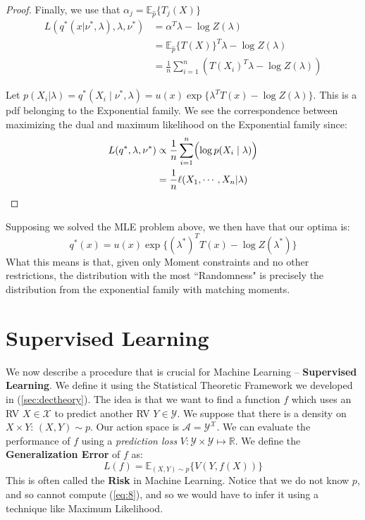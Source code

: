 \documentclass[]{article}
\theoremstyle{mattstyle}
\theoremstyle{definition}
\begin{document}
\begin{proof}
	Finally, we use that $\alpha_j = \mathbb{E}_{\hat{p}}\{T_j(X)\}$
	\begin{align*}
	L(q^*(x| \nu^*, \lambda),\lambda,\nu^*) &= \alpha^T\lambda -\log Z(\lambda)\\
	&= \mathbb{E}_{\hat{p}}\{T(X)\}^T\lambda - \log Z(\lambda)\\
	&= \frac{1}{n}\sum_{i=1}^n \left( T(X_i)^T\lambda - \log Z(\lambda) \right)
	\end{align*}
	
	Let  $p(X_i | \lambda) = q^*(X_i \mid \nu^*, \lambda) = u(x)\exp\{ \lambda^TT(x) - \log Z(\lambda)\}$. This is a pdf belonging to the Exponential family. We see the correspondence between maximizing the dual and maximum likelihood on the Exponential family since:
	\begin{align*}
	L(q^*,\lambda,\nu^*) &\propto \frac{1}{n}\sum_{i=1}^n \Bigl( \log p(X_i \mid \lambda) \Bigr) \\
	&=\frac{1}{n}\ell(X_1, \cdots, X_n | \lambda)
	\end{align*}
\end{proof}

Supposing we solved the MLE problem above, we then have that our optima is:
$$q^*(x)=u(x)\exp\{ (\lambda^*)^TT(x) - \log Z(\lambda^*)\}$$
What this means is that, given only Moment constraints and no other restrictions, the distribution with the most ``Randomness" is precisely the distribution from the exponential family with matching moments.

\newpage

\section{Supervised Learning}

We now describe a procedure that is crucial for Machine Learning -- \textbf{Supervised Learning}. We define it using the Statistical Theoretic Framework we developed in (\ref{sec:dectheory}). The idea is that we want to find a function $f$ which uses an RV $X\in\mathcal{X}$ to predict another RV $Y\in\mathcal{Y}$. We suppose that there is a density on $X\times Y$: $(X,Y) \sim p$. Our action space is $\mathcal{A} = \mathcal{Y}^\mathcal{X}$. We can evaluate the performance of $f$ using a \emph{prediction loss} $V: \mathcal{Y} \times \mathcal{Y} \mapsto \mathbb{R}$. We define the \textbf{Generalization Error} of $f$ as:
\begin{equation}\label{eq:8}
L(f) = \mathbb{E}_{(X,Y)\sim p}\{V(Y,f(X)) \}
\end{equation}
This is often called the \textbf{Risk} in Machine Learning. Notice that we do not know $p$, and so cannot compute (\ref{eq:8}), and so we would have to infer it using a technique like Maximum Likelihood. 
\end{document}
